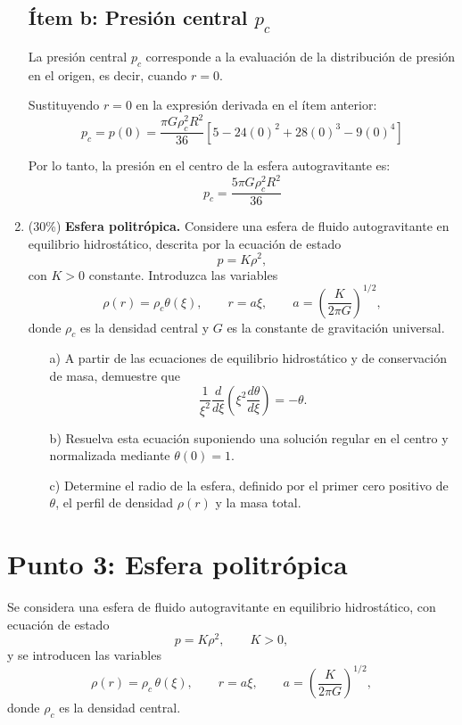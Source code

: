 \documentclass[12pt]{article}
\begin{document}
\begin{enumerate}
\subsection{Ítem b: Presión central $p_c$}

La presión central $p_c$ corresponde a la evaluación de la distribución de presión en el origen, es decir, cuando $r = 0$. 

Sustituyendo $r = 0$ en la expresión derivada en el ítem anterior:
$$
p_c = p(0) = \frac{\pi G \rho_c^2 R^2}{36} \left[ 5 - 24(0)^2 + 28(0)^3 - 9(0)^4 \right]
$$

Por lo tanto, la presión en el centro de la esfera autogravitante es:
$$
p_c = \frac{5\pi G \rho_c^2 R^2}{36}
$$


    \item (30\%) \textbf{Esfera politrópica.} Considere una esfera de fluido autogravitante en equilibrio hidrostático, descrita por la ecuación de estado
    \[
    p = K\rho^2,
    \]
    con $K > 0$ constante. Introduzca las variables
    \[
    \rho(r) = \rho_c\theta(\xi),
    \qquad r = a\xi,
    \qquad a = \left(\frac{K}{2\pi G}\right)^{1/2},
    \]
    donde $\rho_c$ es la densidad central y $G$ es la constante de gravitación universal.
    \begin{itemize}
        \item[a)] A partir de las ecuaciones de equilibrio hidrostático y de conservación de masa, demuestre que
        \[
        \frac{1}{\xi^2}\frac{d}{d\xi}
        \left(\xi^2\frac{d\theta}{d\xi}\right) = -\theta.
        \]
        \item[b)] Resuelva esta ecuación suponiendo una solución regular en el centro y normalizada mediante $\theta(0) = 1$.
        \item[c)] Determine el radio de la esfera, definido por el primer cero positivo de $\theta$, el perfil de densidad $\rho(r)$ y la masa total.
    \end{itemize}
\end{enumerate}

\section{Punto 3: Esfera politrópica}

Se considera una esfera de fluido autogravitante en equilibrio hidrostático, con ecuación de estado
$$
p=K\rho^{2}, \qquad K>0,
$$
y se introducen las variables
$$
\rho(r)=\rho_c\,\theta(\xi), \qquad r=a\xi, \qquad 
a=\left(\frac{K}{2\pi G}\right)^{1/2},
$$
donde $\rho_c$ es la densidad central.
\end{document}

